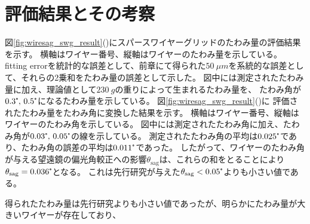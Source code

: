 \documentclass[../../main.tex]{subfiles}
\begin{document}
\section{評価結果とその考察}
図\ref{fig:wiresag_swg_result}()にスパースワイヤーグリッドのたわみ量の評価結果を示す。
横軸はワイヤー番号、縦軸はワイヤーのたわみ量を示している。
fitting errorを統計的な誤差として、前章にて得られた$\SI{50}{\mu m}$を系統的な誤差として、それらの2乗和をたわみ量の誤差として示した。
図中には測定されたたわみ量に加え、理論値として$\SI{230}{g}$の重りによって生まれるたわみ量を、
たわみ角が$0.3\tcdegree,\,0.5\tcdegree$になるたわみ量を示している。
図\ref{fig:wiresag_swg_result}()に
評価されたたわみ量をたわみ角に変換した結果を示す。
横軸はワイヤー番号、縦軸はワイヤーのたわみ角を示している。
図中には測定されたたわみ角に加え、たわみ角が$0.03\tcdegree,\,0.05\tcdegree$の線を示している。
測定されたたわみ角の平均は$0.025\tcdegree$であり、たわみ角の誤差の平均は$0.011\tcdegree$であった。
したがって、ワイヤーのたわみ角が与える望遠鏡の偏光角較正への影響$\theta_{\mathrm{sag}}$は、これらの和をとることにより
$\theta_{\mathrm{sag}}=0.036\tcdegree$となる。
これは先行研究が与えた$\theta_{\mathrm{sag}}<0.05\tcdegree$よりも小さい値である。

得られたたわみ量は先行研究よりも小さい値であったが、明らかにたわみ量が大きいワイヤーが存在しており、
\end{document}
